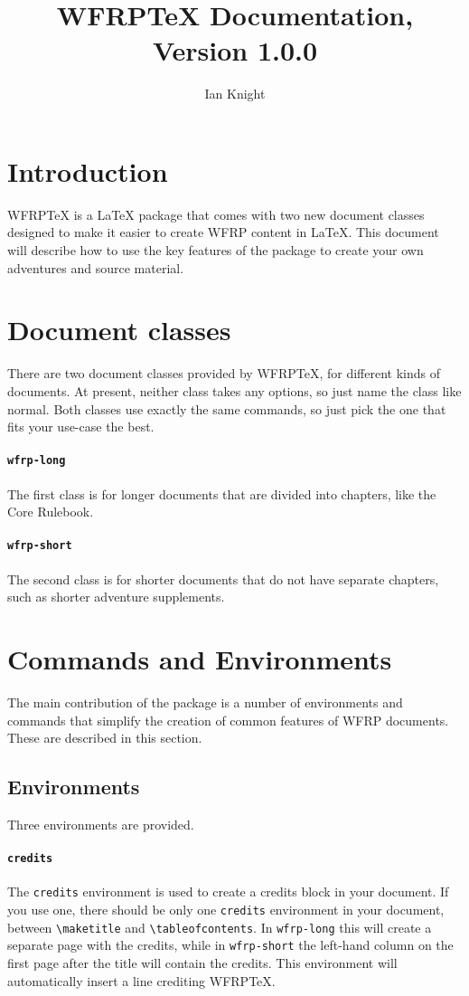 \documentclass[10pt,a4paper]{article}
\title{WFRP\TeX{} Documentation, Version 1.0.0}
\author{Ian Knight}
\date{}
\begin{document}
\maketitle
\tableofcontents

\section{Introduction}
WFRP\TeX{} is a \LaTeX{} package that comes with two new document classes
designed to make it easier to create WFRP content in \LaTeX{}. This document
will describe how to use the key features of the package to create your
own adventures and source material.


\section{Document classes}
There are two document classes provided by WFRP\TeX{}, for different kinds
of documents. At present, neither class takes any options, so just name the
class like normal. Both classes use exactly the same commands, so just pick
the one that fits your use-case the best.

\paragraph{\texttt{wfrp-long}} The first class is for longer documents that
are divided into chapters, like the Core Rulebook.

\paragraph{\texttt{wfrp-short}} The second class is for shorter documents
that do not have separate chapters, such as shorter adventure supplements.


\section{Commands and Environments}
The main contribution of the package is a number of environments and
commands that simplify the creation of common features of WFRP documents.
These are described in this section.

\subsection{Environments}
Three environments are provided.

\paragraph{\texttt{credits}} The \texttt{credits} environment is used to
create a credits block in your document. If you use one, there should be
only one \texttt{credits} environment in your document, between
\texttt{\textbackslash{}maketitle} and \texttt{\textbackslash{}tableofcontents}.
In \texttt{wfrp-long} this will create a separate page with the credits,
while in \texttt{wfrp-short} the left-hand column on the first page after
the title will contain the credits. This environment will automatically
insert a line crediting WFRP\TeX{}.
\end{document}
